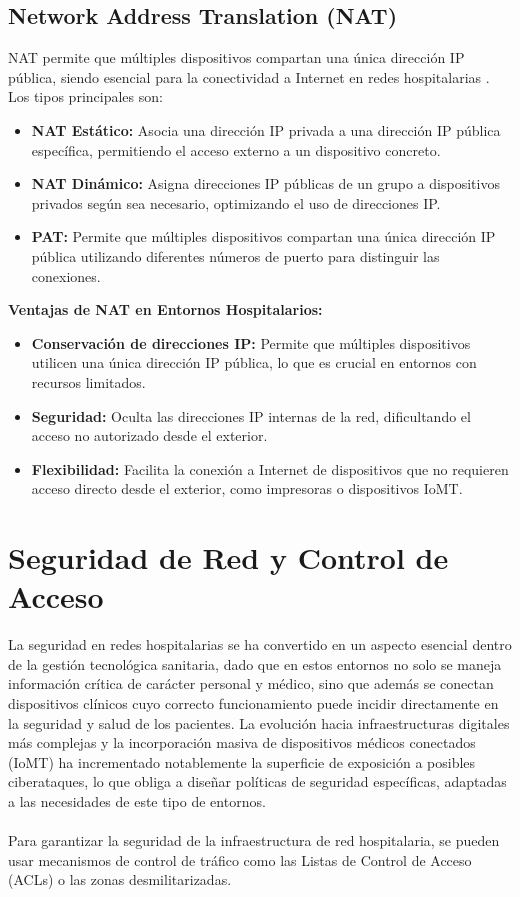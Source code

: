 \subsection{Network Address Translation (NAT)}
\label{subsec:nat}
NAT permite que múltiples dispositivos compartan una única dirección IP pública, siendo esencial para la conectividad a Internet en redes hospitalarias \cite{cisco-hospital-design}. Los tipos principales son:
\begin{itemize}
    \item \textbf{NAT Estático:} Asocia una dirección IP privada a una dirección IP pública específica, permitiendo el acceso externo a un dispositivo concreto.
    \item \textbf{NAT Dinámico:} Asigna direcciones IP públicas de un grupo a dispositivos privados según sea necesario, optimizando el uso de direcciones IP.
    \item \textbf{\ac{PAT}:} Permite que múltiples dispositivos compartan una única dirección IP pública utilizando diferentes números de puerto para distinguir las conexiones.
\end{itemize}

\textbf{Ventajas de NAT en Entornos Hospitalarios:}
\begin{itemize}
    \item \textbf{Conservación de direcciones IP:} Permite que múltiples dispositivos utilicen una única dirección IP pública, lo que es crucial en entornos con recursos limitados.
    \item \textbf{Seguridad:} Oculta las direcciones IP internas de la red, dificultando el acceso no autorizado desde el exterior.
    \item \textbf{Flexibilidad:} Facilita la conexión a Internet de dispositivos que no requieren acceso directo desde el exterior, como impresoras o dispositivos IoMT.
\end{itemize}

\section{Seguridad de Red y Control de Acceso}
La seguridad en redes hospitalarias se ha convertido en un aspecto esencial dentro de la gestión tecnológica sanitaria, dado que en estos entornos no solo se maneja información 
crítica de carácter personal y médico, sino que además se conectan dispositivos clínicos cuyo correcto funcionamiento puede incidir directamente en la seguridad y salud de 
los pacientes. La evolución hacia infraestructuras digitales más complejas y la incorporación masiva de dispositivos médicos conectados (IoMT) ha incrementado notablemente 
la superficie de exposición a posibles ciberataques, lo que obliga a diseñar políticas de seguridad específicas, adaptadas a las necesidades de este tipo de entornos.
\\ \\
Para garantizar la seguridad de la infraestructura de red hospitalaria, se pueden usar mecanismos de control de tráfico como las Listas de Control de Acceso (ACLs) o las zonas desmilitarizadas. 

